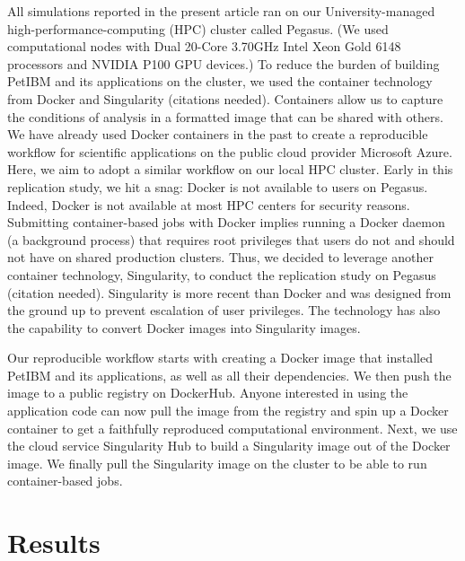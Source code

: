 All simulations reported in the present article ran on our University-managed high-performance-computing (HPC) cluster called Pegasus.
(We used computational nodes with Dual 20-Core 3.70GHz Intel Xeon Gold 6148 processors and NVIDIA P100 GPU devices.)
To reduce the burden of building PetIBM and its applications on the cluster, we used the container technology from Docker and Singularity (citations needed).
Containers allow us to capture the conditions of analysis in a formatted image that can be shared with others.
We have already used Docker containers in the past to create a reproducible workflow for scientific applications on the public cloud provider Microsoft Azure.\supercite{mesnard_barba_2020}
Here, we aim to adopt a similar workflow on our local HPC cluster.
Early in this replication study, we hit a snag: Docker is not available to users on Pegasus.
Indeed, Docker is not available at most HPC centers for security reasons.
Submitting container-based jobs with Docker implies running a Docker daemon (a background process) that requires root privileges that users do not and should not have on shared production clusters.
Thus, we decided to leverage another container technology, Singularity, to conduct the replication study on Pegasus (citation needed).
Singularity is more recent than Docker and was designed from the ground up to prevent escalation of user privileges.
The technology has also the capability to convert Docker images into Singularity images.

Our reproducible workflow starts with creating a Docker image that installed PetIBM and its applications, as well as all their dependencies.
We then push the image to a public registry on DockerHub.
Anyone interested in using the application code can now pull the image from the registry and spin up a Docker container to get a faithfully reproduced computational environment.
Next, we use the cloud service Singularity Hub to build a Singularity image out of the Docker image.
We finally pull the Singularity image on the cluster to be able to run container-based jobs.

\section{Results}

